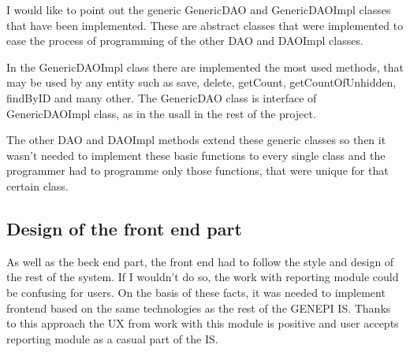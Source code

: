\documentclass[thesis=B,english]{FITthesis}[2012/10/20]
\begin{document}
I would like to point out the generic GenericDAO and GenericDAOImpl classes that have been implemented.
These are abstract classes that were implemented to ease the process of programming of the other DAO and DAOImpl classes.

In the GenericDAOImpl class there are implemented the most used methods, that may be used by any entity such as save, delete, getCount, getCountOfUnhidden, findByID and many other. The GenericDAO class is interface of GenericDAOImpl class, as in the usall in the rest of the project.

The other DAO and DAOImpl methods extend these generic classes so then it wasn't needed to implement these basic functions to every single class and the programmer had to programme only those functions, that were unique for that certain class.

\subsection{Design of the front end part}
As well as the beck end part, the front end had to follow the style and design of the rest of the system. If I wouldn't do so, the work with reporting module could be confusing for users. On the basis of these facts, it was needed to implement frontend based on the same technologies as the rest of the GENEPI IS. Thanks to this approach the UX from work with this module is positive and user accepts reporting module as a casual part of the IS.
\end{document}
